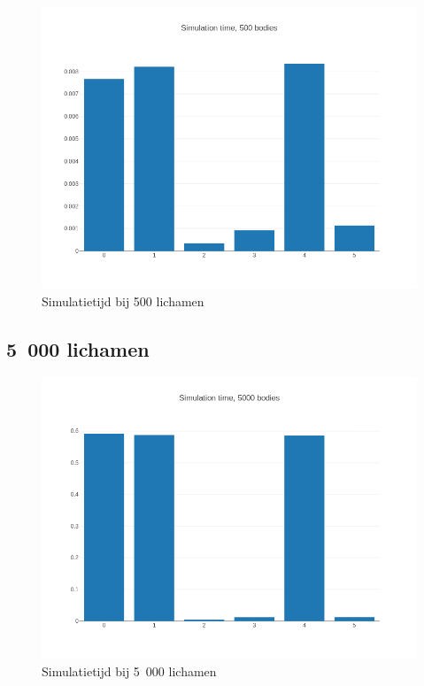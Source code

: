 \documentclass{article}
\begin{document}
\begin{figure}[H]
    \includegraphics[width=\linewidth]{./grafiekskes/hist_simulation500.png}
    \caption{Simulatietijd bij 500 lichamen}
\end{figure}

\subsection{5~000 lichamen}
\begin{figure}[H]
    \includegraphics[width=\linewidth]{./grafiekskes/hist_simulation5000.png}
    \caption{Simulatietijd bij 5~000 lichamen}
\end{figure}
\end{document}
